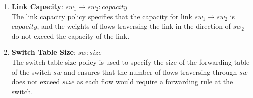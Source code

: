 \begin{enumerate}
	\item \textbf{Link Capacity}: $sw_1 \rightarrow sw_2 : capacity$ \\
	The link capacity policy specifies that the capacity for link $sw_1 \rightarrow sw_2$ is $capacity$, and the weights of flows traversing the link in the direction of $sw_2$ do not exceed the capacity of the link.  
	\item \textbf{Switch Table Size}: $sw : size$ \\
	The switch table size policy is used to specify the size of the forwarding table of the switch $sw$ and ensures that the number of flows traversing through $sw$ does not exceed $size$ as each flow would require a forwarding rule at the switch.
\end{enumerate}